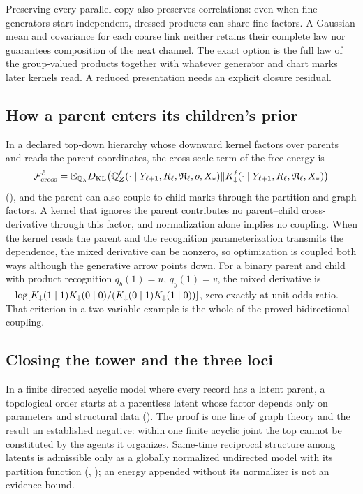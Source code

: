Preserving every parallel copy also preserves correlations: even when fine generators start
independent, dressed products can share fine factors. A Gaussian mean and covariance for each
coarse link neither retains their complete law nor guarantees composition of the next channel.
The exact option is the full law of the group-valued products together with whatever generator
and chart marks later kernels read. A reduced presentation needs an explicit closure residual.

\subsection{How a parent enters its children's prior}

In a declared top-down hierarchy whose downward kernel factors over parents and reads the parent
coordinates, the cross-scale term of the free energy is
\[
\mathcal F^\ell_{\mathrm{cross}}
=\mathbb E_{\mathbb Q_\lambda}D_{\mathrm{KL}}\bigl(\mathbb Q^\ell_Z(\cdot\mid Y_{\ell+1},R_\ell,\mathfrak N_\ell,o,X_*)\Vert
K^\ell_\downarrow(\cdot\mid Y_{\ell+1},R_\ell,\mathfrak N_\ell,X_*)\bigr)
\]
(), and the parent can also couple to child marks through the
partition and graph factors. A kernel that ignores the parent contributes no parent--child
cross-derivative through this factor, and normalization alone implies no coupling. When the kernel reads
the parent and the recognition parameterization transmits the dependence, the mixed derivative can be
nonzero, so optimization is coupled both ways although the generative arrow points down. For a binary
parent and child with product recognition $q_b(1)=u$, $q_y(1)=v$, the mixed derivative is
$-\log[K_\downarrow(1\mid1)K_\downarrow(0\mid0)/(K_\downarrow(0\mid1)K_\downarrow(1\mid0))]$,
zero exactly at unit odds ratio. That criterion in a two-variable example is the whole of the proved
bidirectional coupling.

\subsection{Closing the tower and the three loci}

In a finite directed acyclic model where every record has a latent parent, a topological order starts at
a parentless latent whose factor depends only on parameters and structural data
(). The proof is one line of graph theory and the result an
established negative: within one finite acyclic joint the top cannot be constituted by the agents it
organizes. Same-time reciprocal structure among latents is admissible only as a globally normalized
undirected model with its partition function (, );
an energy appended without its normalizer is not an evidence bound.

